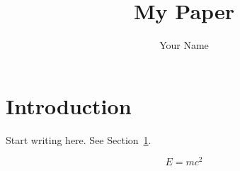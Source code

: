 \documentclass[11pt]{article}
\title{My Paper}
\author{Your Name}
\begin{document}
\maketitle

\section{Introduction}\label{sec:intro}
Start writing here. See Section~\ref{sec:intro}.

\begin{equation}
  E = mc^2
\end{equation}
\end{document}
